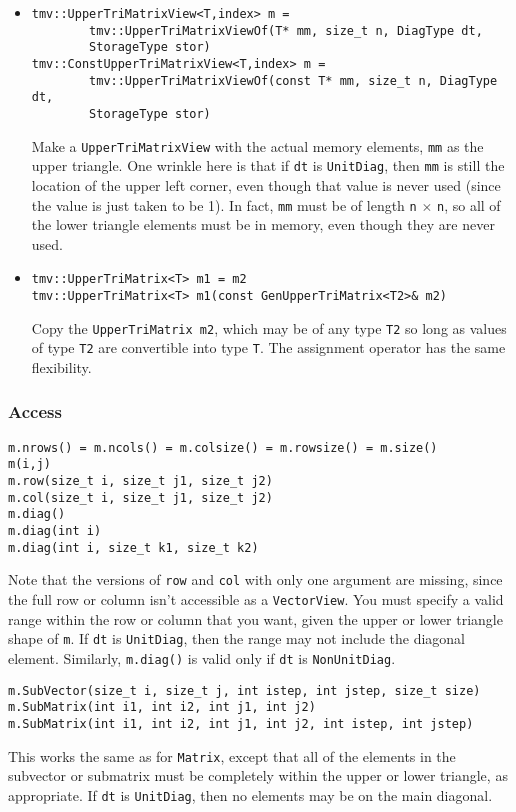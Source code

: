 \documentclass[twoside,letterpaper,11pt]{article}
\renewcommand{\tt}[1]{{\texttt {#1}}}
\begin{document}
\begin{itemize}
\item
\begin{verbatim}
tmv::UpperTriMatrixView<T,index> m = 
        tmv::UpperTriMatrixViewOf(T* mm, size_t n, DiagType dt, 
        StorageType stor)
tmv::ConstUpperTriMatrixView<T,index> m = 
        tmv::UpperTriMatrixViewOf(const T* mm, size_t n, DiagType dt, 
        StorageType stor)
\end{verbatim}
Make a \tt{UpperTriMatrixView} with the actual memory elements, 
\tt{mm} as the upper triangle.
One wrinkle here is that if \tt{dt} is \tt{UnitDiag}, then 
\tt{mm} is still the location of the
upper left corner, even though that value is never used 
(since the value is just taken to
be 1).  In fact, \tt{mm} must be of length \tt{n} $\times$ \tt{n},
so all of the lower triangle
elements must be in memory, even though they are never used.

\item
\begin{verbatim}
tmv::UpperTriMatrix<T> m1 = m2
tmv::UpperTriMatrix<T> m1(const GenUpperTriMatrix<T2>& m2)
\end{verbatim}
Copy the \tt{UpperTriMatrix m2}, which may be of any type \tt{T2} so long
as values of type \tt{T2} are convertible into type \tt{T}.
The assignment operator has the same flexibility.

\end{itemize}

\subsubsection{Access}

\begin{verbatim}
m.nrows() = m.ncols() = m.colsize() = m.rowsize() = m.size()
m(i,j)
m.row(size_t i, size_t j1, size_t j2)
m.col(size_t i, size_t j1, size_t j2)
m.diag()
m.diag(int i)
m.diag(int i, size_t k1, size_t k2)
\end{verbatim}
Note that the versions of \tt{row} and \tt{col} with only one argument are
missing, since the full row or column isn't accessible as a \tt{VectorView}.
You must specify a valid range within the row or column that you want, 
given the upper or lower triangle shape of \tt{m}.
If \tt{dt} is \tt{UnitDiag}, then the range may not include the diagonal element.
Similarly, \tt{m.diag()} is valid only if \tt{dt} is \tt{NonUnitDiag}.

\begin{verbatim}
m.SubVector(size_t i, size_t j, int istep, int jstep, size_t size)
m.SubMatrix(int i1, int i2, int j1, int j2)
m.SubMatrix(int i1, int i2, int j1, int j2, int istep, int jstep)
\end{verbatim}
This works the same as for \tt{Matrix}, except that all of the elements in the 
subvector or submatrix must be completely within the upper or lower triangle, as
appropriate.  If \tt{dt} is \tt{UnitDiag}, then no elements may be on the 
main diagonal.
\end{document}
